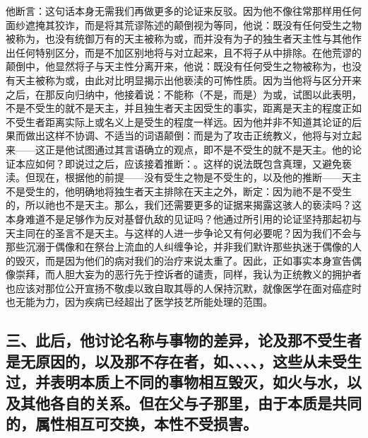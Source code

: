 他断言：这句话本身无需我们再做更多的论证来反驳。因为他不像往常那样用任何面纱遮掩其狡诈，而是将其荒谬陈述的颠倒视为等同，他说：既没有任何受生之物被称为，也没有统御万有的天主被称为或，而并没有为子的独生者天主性与其他作出任何特别区分，而是不加区别地将与对立起来，且不将子从中排除。在他荒谬的颠倒中，他显然将子与天主性分离开来，他说：既没有任何受生之物被称为，也没有天主被称为或，由此对比明显揭示出他亵渎的可怖性质。因为当他将与区分开来之后，在那反向归纳中，他接着说：不能称（不是，而是）为或，试图以此表明，不是不受生的就不是天主，并且独生者天主因受生的事实，距离是天主的程度正如不受生者距离实际上或名义上是受生的程度一样远。因为他并非不知道其论证的后果而做出这样不协调、不适当的词语颠倒：而是为了攻击正统教义，他将与对立起来——这正是他试图通过其言语确立的观点，即不是不受生的就不是天主。他的论证本应如何？即说过之后，应该接着推断：。这样的说法既包含真理，又避免亵渎。但现在，根据他的前提——没有受生之物是不受生的，以及他的推断——天主不是受生的，他明确地将独生者天主排除在天主之外，断定：因为祂不是不受生的，所以祂也不是天主。那么，我们还需要更多的证据来揭露这骇人的亵渎吗？这本身难道不是足够作为反对基督仇敌的见证吗？他通过所引用的论证坚持那起初与天主同在的圣言不是天主。与这样的人进一步争论又有何必要呢？因为我们不会与那些沉溺于偶像和在祭台上流血的人纠缠争论，并非我们默许那些执迷于偶像的人的毁灭，而是因为他们的病对我们的治疗来说太重了。因此，正如事实本身宣告偶像崇拜，而人胆大妄为的恶行先于控诉者的谴责，同样，我认为正统教义的拥护者也应该对那位公开宣扬不敬虔以致自取其辱的人保持沉默，就像医学在面对癌症时也无能为力，因为疾病已经超出了医学技艺所能处理的范围。\par


\subsection{三、此后，他讨论名称与事物的差异，论及那不受生者是无原因的，以及那不存在者，如、、、、，这些从未受生过，并表明本质上不同的事物相互毁灭，如火与水，以及其他各自的关系。但在父与子那里，由于本质是共同的，属性相互可交换，本性不受损害。}

